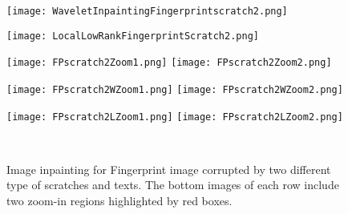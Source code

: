 \documentclass[letterpaper,10pt]{article}
\begin{document}
\begin{figure}[htp]
\begin{center}
\begin{minipage}{0.32\linewidth}
\texttt{[image: WaveletInpaintingFingerprintscratch2.png]}
\end{minipage}
\begin{minipage}{0.32\linewidth}
\texttt{[image: LocalLowRankFingerprintScratch2.png]}
\end{minipage}
\begin{minipage}{0.32\linewidth}
\texttt{[image: FPscratch2Zoom1.png]}
\texttt{[image: FPscratch2Zoom2.png]}\\
\end{minipage}
\begin{minipage}{0.32\linewidth}
\texttt{[image: FPscratch2WZoom1.png]}
\texttt{[image: FPscratch2WZoom2.png]}\\
\end{minipage}
\begin{minipage}{0.32\linewidth}
\texttt{[image: FPscratch2LZoom1.png]}
\texttt{[image: FPscratch2LZoom2.png]}\\
\end{minipage}\\
\end{center}
\caption{Image inpainting for Fingerprint image corrupted by two different type of scratches and texts. The bottom images of each row include two zoom-in regions highlighted by red boxes.}
\label{fig:Inpainting Scratch}
\end{figure}
\end{document}
